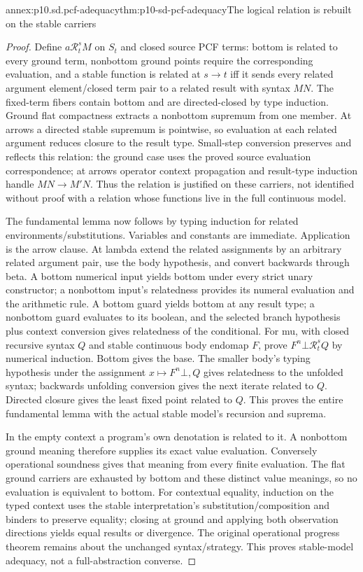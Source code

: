 \begin{annexitem}{annex:p10.sd.pcf-adequacy}{thm:p10-sd-pcf-adequacy}{The logical relation is rebuilt on the stable carriers}
\begin{proof}
Define \(a\mathrel{\mathcal R^s_t}M\) on \(S_t\) and closed source
PCF terms: bottom is related to every ground term, nonbottom ground
points require the corresponding evaluation, and a stable function
is related at \(s\to t\) iff it sends every related argument
element/closed term pair to a related result with syntax \(M N\).
The fixed-term fibers contain bottom and are directed-closed by type
induction. Ground flat compactness extracts a nonbottom supremum from
one member. At arrows a directed stable supremum is pointwise, so
evaluation at each related argument reduces closure to the result type.
Small-step conversion preserves and reflects this relation: the ground
case uses the proved source evaluation correspondence; at arrows operator
context propagation and result-type induction handle \(M N\to M' N\).
Thus the relation is justified on these carriers, not identified without
proof with a relation whose functions live in the full continuous model.

The fundamental lemma now follows by typing induction for related
environments/substitutions. Variables and constants are immediate.
Application is the arrow clause. At lambda extend the related assignments
by an arbitrary related argument pair, use the body hypothesis, and
convert backwards through beta. A bottom numerical input yields bottom
under every strict unary constructor; a nonbottom input's relatedness
provides its numeral evaluation and the arithmetic rule. A bottom guard
yields bottom at any result type; a nonbottom guard evaluates to its
boolean, and the selected branch hypothesis plus context conversion
gives relatedness of the conditional.
For mu, with closed recursive syntax \(Q\) and stable continuous body
endomap \(F\), prove \(F^n\bot\mathrel{\mathcal R^s_t}Q\) by
numerical induction. Bottom gives the base. The smaller body's typing
hypothesis under the assignment \(x\mapsto F^n\bot,Q\) gives
relatedness to the unfolded syntax; backwards unfolding conversion gives
the next iterate related to \(Q\). Directed closure gives the least
fixed point related to \(Q\). This proves the entire fundamental lemma
with the actual stable model's recursion and suprema.

In the empty context a program's own denotation is related to it.
A nonbottom ground meaning therefore supplies its exact value evaluation.
Conversely operational soundness gives that meaning from every finite
evaluation. The flat ground carriers are exhausted by bottom and these
distinct value meanings, so no evaluation is equivalent to bottom.
For contextual equality, induction on the typed context uses the stable
interpretation's substitution/composition and binders to preserve equality;
closing at ground and applying both observation directions yields equal
results or divergence. The original operational progress theorem remains
about the unchanged syntax/strategy. This proves stable-model adequacy,
not a full-abstraction converse.
\end{proof}
\end{annexitem}

